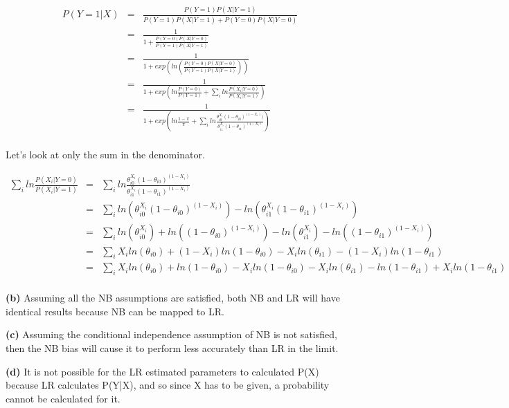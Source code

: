 \documentclass[11pt]{article}
\renewcommand{\part}[1] {\vspace{.10in} {\bf (#1)}}
\begin{document}
\begin{eqnarray*}
P(Y=1|X) &=& \frac{P(Y=1)P(X|Y=1)}{P(Y=1)P(X|Y=1)+P(Y=0)P(X|Y=0)}\\
&=& \frac{1}{1+\frac{P(Y=0)P(X|Y=0)}{P(Y=1)P(X|Y=1)}}\\
&=& \frac{1}{1+exp(ln(\frac{P(Y=0)P(X|Y=0)}{P(Y=1)P(X|Y=1)}))}\\
&=& \frac{1}{1+exp(ln\frac{P(Y=0)}{P(Y=1)} + \sum_i{ln\frac{P(X_i|Y=0)}{P(X_i|Y=1)}})}\\
&=& \frac{1}{1+exp(ln\frac{1-\pi}{\pi} + \sum_i{ln\frac{\theta_{i0}^{X_i}(1-\theta_{i0})^{(1-X_i)})}{\theta_{i1}^{X_i}(1-\theta_{i1})^{(1-X_i)}}})}\\
\end{eqnarray*}

Let's look at only the sum in the denominator.

\begin{eqnarray*}
\sum_i{ln\frac{P(X_i|Y=0)}{P(X_i|Y=1)}} &=&  \sum_i{ln\frac{\theta_{i0}^{X_i}(1-\theta_{i0})^{(1-X_i)}}{\theta_{i1}^{X_i}(1-\theta_{i1})^{(1-X_i)}}}\\
&=& \sum_i{ln(\theta_{i0}^{X_i}(1-\theta_{i0})^{(1-X_i)}) - ln(\theta_{i1}^{X_i}(1-\theta_{i1})^{(1-X_i)})}\\
&=& \sum_i{ln(\theta_{i0}^{X_i}) + ln((1-\theta_{i0})^{(1-X_i)}) - ln(\theta_{i1}^{X_i}) - ln((1-\theta_{i1})^{(1-X_i)})}\\
&=& \sum_i{X_iln(\theta_{i0}) + (1-X_i)ln(1-\theta_{i0}) - X_iln(\theta_{i1}) - (1-X_i)ln(1-\theta_{i1})}\\
&=& \sum_i{X_iln(\theta_{i0}) + ln(1-\theta_{i0}) - X_iln(1-\theta_{i0}) - X_iln(\theta_{i1}) - ln(1-\theta_{i1}) + X_iln(1-\theta_{i1})}\\
\end{eqnarray*}

\part{b}
Assuming all the NB assumptions are satisfied, both NB and LR will have identical results because NB can be mapped to LR. 

\part{c}
Assuming the conditional independence assumption of NB is not satisfied, then the NB bias will cause it to perform less accurately than LR in the limit.

\part{d}
It is not possible for the LR estimated parameters to calculated P(X) because LR calculates P(Y|X), and so since X has to be given, a probability cannot be calculated for it.
\end{document}
